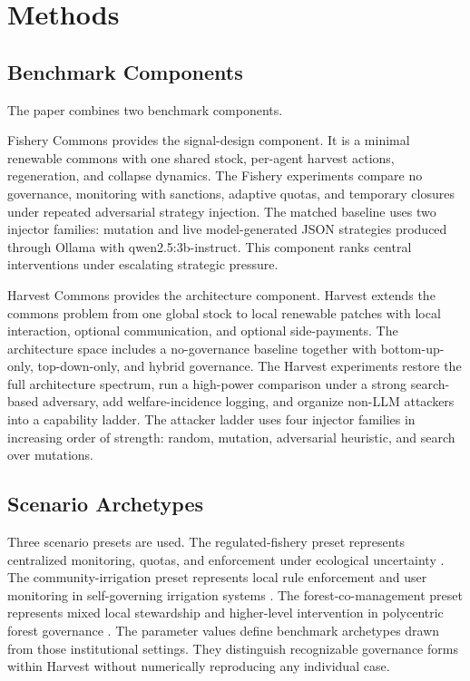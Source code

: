 \section{Methods}

\subsection{Benchmark Components}

The paper combines two benchmark components.

Fishery Commons provides the signal-design component. It is a minimal renewable commons with one shared stock, per-agent harvest actions, regeneration, and collapse dynamics. The Fishery experiments compare no governance, monitoring with sanctions, adaptive quotas, and temporary closures under repeated adversarial strategy injection. The matched baseline uses two injector families: mutation and live model-generated JSON strategies produced through Ollama with qwen2.5:3b-instruct. This component ranks central interventions under escalating strategic pressure.

Harvest Commons provides the architecture component. Harvest extends the commons problem from one global stock to local renewable patches with local interaction, optional communication, and optional side-payments. The architecture space includes a no-governance baseline together with bottom-up-only, top-down-only, and hybrid governance. The Harvest experiments restore the full architecture spectrum, run a high-power comparison under a strong search-based adversary, add welfare-incidence logging, and organize non-LLM attackers into a capability ladder. The attacker ladder uses four injector families in increasing order of strength: random, mutation, adversarial heuristic, and search over mutations.

\subsection{Scenario Archetypes}

Three scenario presets are used. The regulated-fishery preset represents centralized monitoring, quotas, and enforcement under ecological uncertainty \citep{hilborn2005, gutierrez2011}. The community-irrigation preset represents local rule enforcement and user monitoring in self-governing irrigation systems \citep{ostrom1993, ostrom1994, villamayor2020}. The forest-co-management preset represents mixed local stewardship and higher-level intervention in polycentric forest governance \citep{nagendra2012}. The parameter values define benchmark archetypes drawn from those institutional settings. They distinguish recognizable governance forms within Harvest without numerically reproducing any individual case.

